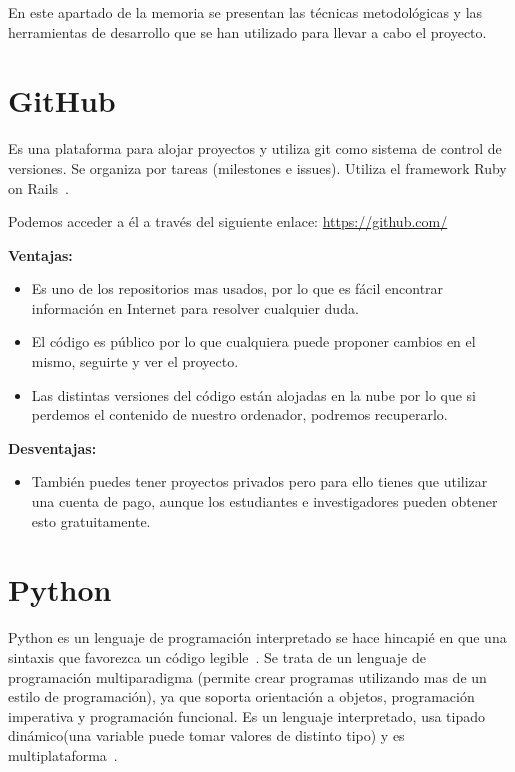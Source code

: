 
En este apartado de la memoria se presentan las técnicas metodológicas y las herramientas de desarrollo que se han utilizado para llevar a cabo el proyecto. 

\section{GitHub}
Es una plataforma para alojar proyectos y utiliza git como sistema de control de versiones. Se organiza por tareas (milestones e issues).
Utiliza el framework Ruby on Rails~\cite{github}.

Podemos acceder a él a través del siguiente enlace: 
\url{https://github.com/}

\textbf{Ventajas:}

\begin{itemize}
\item Es uno de los repositorios mas usados, por lo que es fácil encontrar información en Internet para resolver cualquier duda.

\item El código es público por lo que cualquiera puede proponer cambios en el mismo, seguirte y ver el proyecto.

\item Las distintas versiones del código están alojadas en la nube por lo que si perdemos el contenido de nuestro ordenador, podremos recuperarlo.
\end{itemize}

\textbf{Desventajas:}

\begin{itemize}
\item También puedes tener proyectos privados pero para ello tienes que utilizar una cuenta de pago, aunque los estudiantes e investigadores pueden obtener esto gratuitamente.
\end{itemize}

\section{Python}
Python es un lenguaje de programación interpretado se hace hincapié en que una sintaxis que favorezca un código legible~\cite{python}.
Se trata de un lenguaje de programación multiparadigma (permite crear programas utilizando mas de un estilo de programación), ya que soporta orientación a objetos, programación imperativa y programación funcional. Es un lenguaje interpretado, usa tipado dinámico(una variable puede tomar valores de distinto tipo) y es multiplataforma~\cite{wiki:python}.

